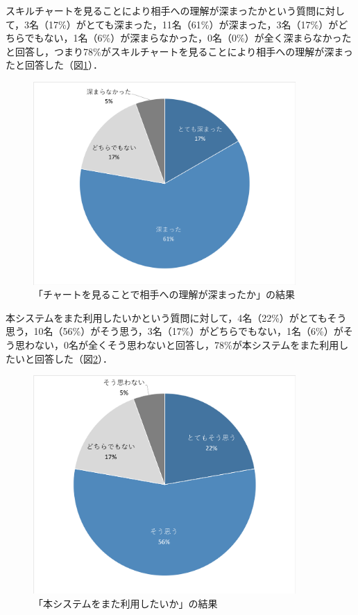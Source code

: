 \documentclass{funthesis}
\begin{document}
スキルチャートを見ることにより相手への理解が深まったかという質問に対して，3名（17\%）がとても深まった，11名（61\%）が深まった，3名（17\%）がどちらでもない，1名（6\%）が深まらなかった，0名（0\%）が全く深まらなかったと回答し，つまり78\%がスキルチャートを見ることにより相手への理解が深まったと回答した（図\ref{testChart0}）．
\begin{figure}[H]
 \centering
   \includegraphics[width=100mm]{figures/finalExChart2.png}
 \caption{「チャートを見ることで相手への理解が深まったか」の結果}
 \label{testChart0}
\end{figure}

本システムをまた利用したいかという質問に対して，4名（22\%）がとてもそう思う，10名（56\%）がそう思う，3名（17\%）がどちらでもない，1名（6\%）がそう思わない，0名が全くそう思わないと回答し，78\%が本システムをまた利用したいと回答した（図\ref{testChart1}）．
\begin{figure}[H]
 \centering
   \includegraphics[width=100mm]{figures/finalExChart.png}
 \caption{「本システムをまた利用したいか」の結果}
 \label{testChart1}
\end{figure}
\end{document}
